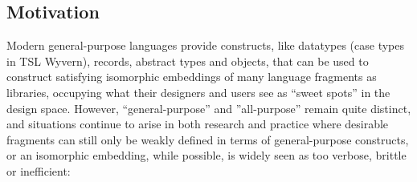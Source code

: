 \subsection{Motivation}
Modern general-purpose languages provide constructs, like datatypes (case types in TSL Wyvern), records, abstract types and objects, that can be used to construct satisfying isomorphic embeddings of many language fragments as libraries, occupying what their designers and users see as ``sweet spots'' in the design space. However, ``general-purpose'' and ''all-purpose'' remain quite distinct, and situations continue to arise in both research and practice where desirable fragments can still only be weakly defined in terms of general-purpose constructs, or an isomorphic embedding, while possible, is widely seen as too verbose, brittle or inefficient:

